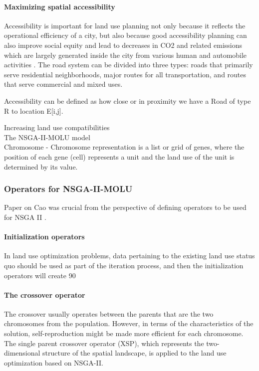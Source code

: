 \documentclass[12pt]{article} %
\begin{document}
\paragraph*{Maximizing spatial accessibility}
Accessibility is important for land use planning not only because it reflects the operational efficiency of a city, but also because good accessibility planning can also improve social equity and lead to decreases in CO2 and related emissions which are largely generated inside the city from various human and automobile activities . The road system can be divided into three types:
roads that primarily serve residential neighborhoods, major routes for all transportation,
and routes that serve commercial and mixed uses.

Accessibility can be defined as how close or in proximity we have a Road of type R to location E[i,j].

Increasing land use compatibilities \\[.15cm]

The NSGA-II-MOLU model \\
Chromosome - Chromosome representation is a list or grid of genes, where the position of each
gene (cell) represents a unit and the land use of the unit is determined by its value.


\subsubsection*{Operators for NSGA-II-MOLU}
Paper on Cao was crucial from the perspective of defining operators to be used for NSGA II . \\
\paragraph*{Initialization operators}
In land use optimization problems, data pertaining to the existing land use status quo should be used as part of the iteration process, and then the initialization operators will create 90%
\paragraph*{The crossover operator}
The crossover usually operates between the parents that are the two chromosomes from the population. However, in terms of the characteristics of the solution, self-reproduction might be made more efficient for each chromosome. The single parent crossover operator (XSP), which represents the two-dimensional structure of the spatial landscape, is applied to the land use optimization based on NSGA-II.
\end{document}
